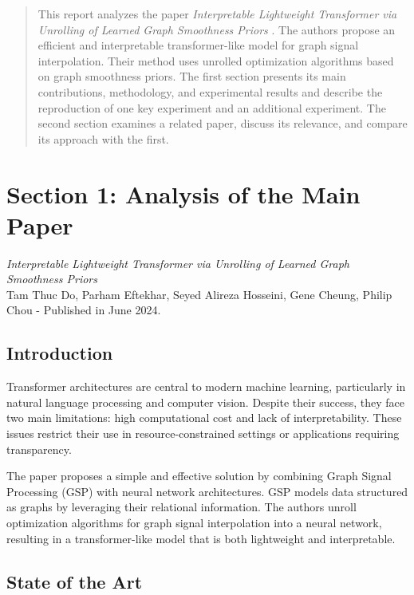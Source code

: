 \documentclass{article}
\theoremstyle{plain}
\theoremstyle{definition}
\theoremstyle{remark}
\begin{document}
\begin{abstract}
This report analyzes the paper \textit{Interpretable Lightweight Transformer via Unrolling of Learned Graph Smoothness Priors} \cite{do2024interpretable}. The authors propose an efficient and interpretable transformer-like model for graph signal interpolation. Their method uses unrolled optimization algorithms based on graph smoothness priors. The first section presents its main contributions, methodology, and experimental results and describe the reproduction of one key experiment and an additional experiment. The second section examines a related paper, discuss its relevance, and compare its approach with the first.
\end{abstract}

\section*{Section 1: Analysis of the Main Paper}

\textit{Interpretable Lightweight Transformer via Unrolling of Learned Graph Smoothness Priors}
\\Tam Thuc Do, Parham Eftekhar, Seyed Alireza Hosseini, Gene Cheung, Philip Chou - Published in June 2024.

\setcounter{section}{1}
\subsection{Introduction}

Transformer architectures are central to modern machine learning, particularly in natural language processing and computer vision. Despite their success, they face two main limitations: high computational cost and lack of interpretability. These issues restrict their use in resource-constrained settings or applications requiring transparency.

The paper proposes a simple and effective solution by combining Graph Signal Processing (GSP) with neural network architectures. GSP models data structured as graphs by leveraging their relational information. The authors unroll optimization algorithms for graph signal interpolation into a neural network, resulting in a transformer-like model that is both lightweight and interpretable.

\subsection{State of the Art}
\end{document}
